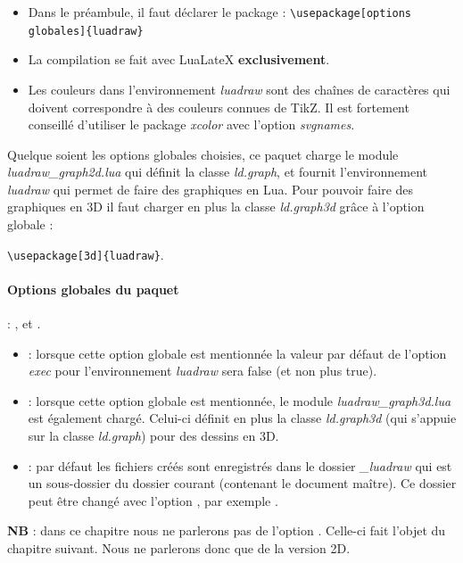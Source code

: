 \begin{itemize}
\item Dans le préambule, il faut déclarer le package \luadrawenv : \verb|\usepackage[options globales]{luadraw}|
\item La compilation se fait avec LuaLateX \textbf{exclusivement}.
\item Les couleurs dans l'environnement \emph{luadraw} sont des chaînes de caractères qui doivent correspondre à des couleurs connues de TikZ. Il est fortement conseillé d'utiliser le package \emph{xcolor} avec l'option \emph{svgnames}.
\end{itemize}

Quelque soient les options globales choisies, ce paquet charge le module \emph{luadraw\_graph2d.lua} qui définit la classe \emph{ld.graph}, et fournit l'environnement \emph{luadraw} qui permet de faire des graphiques en Lua. Pour pouvoir faire des graphiques en 3D il faut charger en plus la classe \emph{ld.graph3d} grâce à l'option globale  :\par
\hfil\verb|\usepackage[3d]{luadraw}|.\hfil

\paragraph{Options globales du paquet} : ,  et .

\begin{itemize}
    \item {} : lorsque cette option globale est mentionnée la valeur par défaut de l'option \emph{exec} pour l'environnement \emph{luadraw} sera false (et non plus true).
    \item {} : lorsque cette option globale est mentionnée, le module \emph{luadraw\_graph3d.lua} est également chargé. Celui-ci définit en plus la classe \emph{ld.graph3d} (qui s'appuie sur la classe \emph{ld.graph}) pour des dessins en 3D. 
    \item {} : par défaut les fichiers créés sont enregistrés dans le dossier \emph{\_luadraw} qui est un sous-dossier du dossier courant (contenant le document maître). Ce dossier peut être changé avec l'option , par exemple .
\end{itemize}

\noindent\textbf{NB} : dans ce chapitre nous ne parlerons pas de l'option . Celle-ci fait l'objet du chapitre suivant. Nous ne parlerons donc que de la version 2D.

